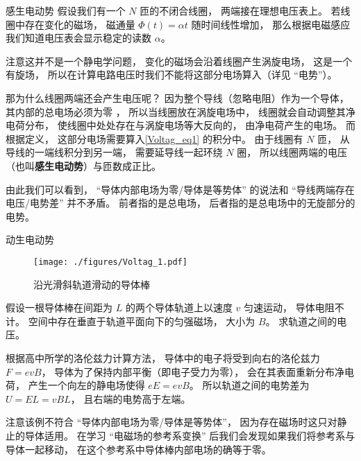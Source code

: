 \begin{example}{感生电动势}
假设我们有一个 $N$ 匝的不闭合线圈， 两端接在理想电压表上。 若线圈中存在变化的磁场， 磁通量 $\Phi(t) = \alpha t$ 随时间线性增加， 那么根据电磁感应我们知道电压表会显示稳定的读数 $\alpha$。

注意这并不是一个静电学问题， 变化的磁场会沿着线圈产生涡旋电场， 这是一个有旋场， 所以在计算电路电压时我们不能将这部分电场算入（详见 “电势”）。

那为什么线圈两端还会产生电压呢？ 因为整个导线（忽略电阻）作为一个导体， 其内部的总电场必须为零%
， 所以当线圈放在涡旋电场中， 线圈就会自动调整其净电荷分布， 使线圈中处处存在与涡旋电场等大反向的， 由净电荷产生的电场。 而根据定义， 这部分电场需要算入\autoref{Voltag_eq1} 的积分中。 由于线圈有 $N$ 匝， 从导线的一端线积分到另一端， 需要延导线一起环绕 $N$ 圈， 所以线圈两端的电压（也叫\textbf{感生电动势}）与匝数成正比。
\end{example}

由此我们可以看到， “导体内部电场为零/导体是等势体” 的说法和 “导线两端存在电压/电势差” 并不矛盾。 前者指的是总电场， 后者指的是总电场中的无旋部分的电势。

\begin{example}{动生电动势}
\begin{figure}[ht]
\centering
\texttt{[image: ./figures/Voltag\_1.pdf]}
\caption{沿光滑斜轨道滑动的导体棒} \label{Voltag_fig1}
\end{figure}
假设一根导体棒在间距为 $L$ 的两个导体轨道上以速度 $v$ 匀速运动， 导体电阻不计。 空间中存在垂直于轨道平面向下的匀强磁场， 大小为 $B$。 求轨道之间的电压。

根据高中所学的洛伦兹力计算方法， 导体中的电子将受到向右的洛伦兹力 $F = evB$， 导体为了保持内部平衡（即电子受力为零）， 会在其表面重新分布净电荷， 产生一个向左的静电场使得 $eE = evB$。 所以轨道之间的电势差为 $U = EL = vBL$， 且右端的电势高于左端。
\end{example}

注意该例不符合 “导体内部电场为零/导体是等势体”， 因为存在磁场时这只对静止的导体适用。 在学习 “电磁场的参考系变换” 后我们会发现如果我们将参考系与导体一起移动， 在这个参考系中导体棒内部电场的确等于零。
